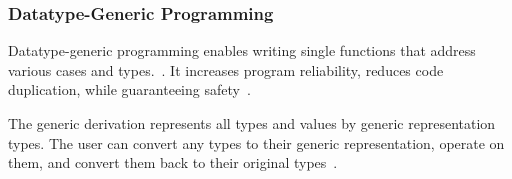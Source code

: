 



\begin{frame}\frametitle{Datatype-Generic Programming}
    
Datatype-generic programming enables writing single functions that address various cases and types.~\cite{derivable-type-classes}. 
It increases program reliability, reduces code duplication, while guaranteeing safety~\cite{datatype-generic-programming,optimizing-generics}.

    
The generic derivation represents all types and values by generic representation types. The user can convert any types to their generic representation, operate on them, and convert them back to their original types~\cite{optimizing-generics, ghc-generics}.

\end{frame}